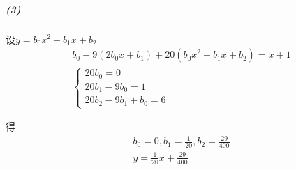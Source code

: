 \documentclass[UTF8]{ctexart}
\begin{document}
    \subparagraph*{(3)}
    设$y = b_0 x^2 + b_1 x + b_2$
    \begin{align*}
        b_0 - 9(2b_0x + b_1) + 20(b_0 x^2 + b_1 x + b_2) = x + 1\\
        \begin{cases}
            20b_0 = 0 \\
            20b_1 -9b_0 = 1\\
            20b_2 - 9b_1 + b_0 = 6
        \end{cases}
    \end{align*}

    得
    \begin{align*}
        b_0 = 0, b_1 = \frac{1}{20} , b_2 = \frac{29}{400}\\y = \frac{1}{20} x + \frac{29}{400} 
    \end{align*}
    
    
\end{document}
